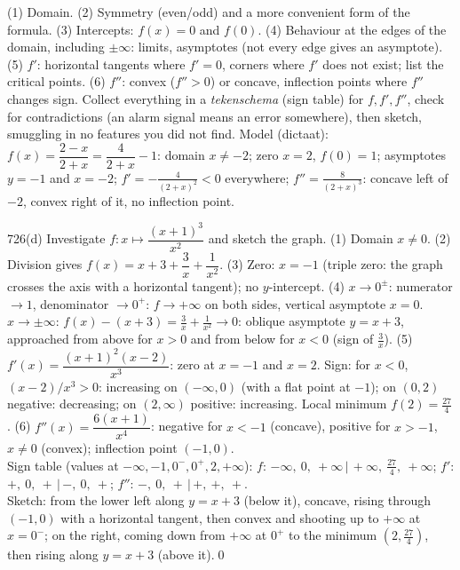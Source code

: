 \begin{strategy}
(1) Domain. (2) Symmetry (even/odd) and a more convenient form of the formula. (3) Intercepts: $f(x)=0$ and $f(0)$. (4) Behaviour at the edges of the domain, including $\pm\infty$: limits, asymptotes (not every edge gives an asymptote). (5) $f'$: horizontal tangents where $f'=0$, corners where $f'$ does not exist; list the critical points. (6) $f''$: convex ($f''>0$) or concave, inflection points where $f''$ changes sign. Collect everything in a \emph{tekenschema} (sign table) for $f,f',f''$, check for contradictions (an alarm signal means an error somewhere), then sketch, smuggling in no features you did not find. Model (dictaat): $f(x)=\dfrac{2-x}{2+x}=\dfrac4{2+x}-1$: domain $x\ne-2$; zero $x=2$, $f(0)=1$; asymptotes $y=-1$ and $x=-2$; $f'=-\frac4{(2+x)^2}<0$ everywhere; $f''=\frac8{(2+x)^3}$: concave left of $-2$, convex right of it, no inflection point.
\end{strategy}

\begin{bookex}{726(d)}
Investigate $f:x\mapsto\dfrac{(x+1)^3}{x^2}$ and sketch the graph.
\solution
(1) Domain $x\ne0$. (2) Division gives $f(x)=x+3+\dfrac3x+\dfrac1{x^2}$. (3) Zero: $x=-1$ (triple zero: the graph crosses the axis with a horizontal tangent); no $y$-intercept. (4) $x\to0^\pm$: numerator $\to1$, denominator $\to0^+$: $f\to+\infty$ on both sides, vertical asymptote $x=0$. $x\to\pm\infty$: $f(x)-(x+3)=\frac3x+\frac1{x^2}\to0$: oblique asymptote $y=x+3$, approached from above for $x>0$ and from below for $x<0$ (sign of $\frac3x$). (5) $f'(x)=\dfrac{(x+1)^2(x-2)}{x^3}$: zero at $x=-1$ and $x=2$. Sign: for $x<0$, $(x-2)/x^3>0$: increasing on $(-\infty,0)$ (with a flat point at $-1$); on $(0,2)$ negative: decreasing; on $(2,\infty)$ positive: increasing. Local minimum $f(2)=\frac{27}4$. (6) $f''(x)=\dfrac{6(x+1)}{x^4}$: negative for $x<-1$ (concave), positive for $x>-1$, $x\ne0$ (convex); inflection point $(-1,0)$.\\
Sign table (values at $-\infty,-1,0^-,0^+,2,+\infty$): $f$: $-\infty,\ 0,\ +\infty\,|\,+\infty,\ \frac{27}4,\ +\infty$; $f'$: $+,\ 0,\ +\,|\,-,\ 0,\ +$; $f''$: $-,\ 0,\ +\,|\,+,\ +,\ +$.\\
Sketch: from the lower left along $y=x+3$ (below it), concave, rising through $(-1,0)$ with a horizontal tangent, then convex and shooting up to $+\infty$ at $x=0^-$; on the right, coming down from $+\infty$ at $0^+$ to the minimum $(2,\frac{27}4)$, then rising along $y=x+3$ (above it).\qed
\end{bookex}

